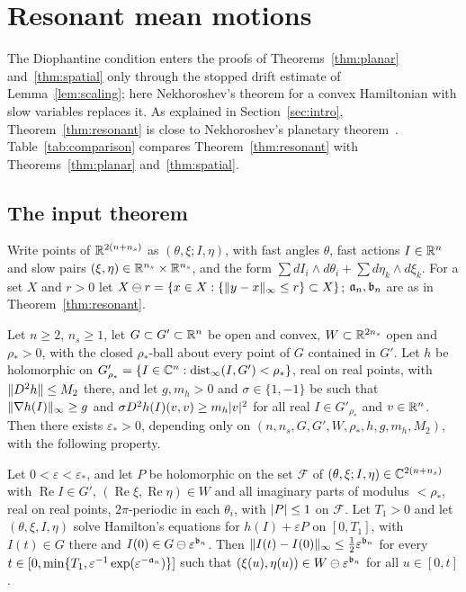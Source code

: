 \section{Resonant mean motions}\label{sec:resonant}

The Diophantine condition enters the proofs of Theorems~\ref{thm:planar} and~\ref{thm:spatial} only through the
stopped drift estimate of Lemma~\ref{lem:scaling}; here Nekhoroshev's theorem for a convex Hamiltonian with slow
variables replaces it. As explained in Section~\ref{sec:intro}, Theorem~\ref{thm:resonant} is close to Nekhoroshev's planetary theorem~\cite[Theorem~12.3]{Nek77}. Table~\ref{tab:comparison} compares
Theorem~\ref{thm:resonant} with Theorems~\ref{thm:planar} and~\ref{thm:spatial}.

\subsection{The input theorem}

Write points of $\mathbb{R}^{2(n+n_s)}$ as $(\theta,\xi;I,\eta)$, with fast angles $\theta$, fast actions $I\in\mathbb{R}^n$ and
slow pairs $(\xi,\eta)\in\mathbb{R}^{n_s}\times\mathbb{R}^{n_s}$, and the form $\sum dI_i\wedge d\theta_i+\sum d\eta_k\wedge
d\xi_k$. For a set $X$ and $r>0$ let $X\ominus r=\{x\in X:\{\lVert y-x\rVert_\infty\le r\}\subset X\}$; $\mathfrak{a}_n{},\mathfrak{b}_n{}$ are
as in Theorem~\ref{thm:resonant}.

\begin{proposition}\label{thm:partialnek}
Let $n\ge2$, $n_s\ge1$, let $G\subset G'\subset\mathbb{R}^n$ be open and convex, $W\subset\mathbb{R}^{2n_s}$ open and
$\rho_*>0$, with the closed $\rho_*$-ball about every point of $G$ contained in $G'$. Let $h$ be holomorphic on
$G'_{\rho_*}=\{I\in\mathbb{C}^n:\operatorname{dist}_\infty(I,G')<\rho_*\}$, real on real points, with
$\lVert D^2h\rVert\le M_2$ there, and let $g,m_h>0$ and $\sigma\in\{1,-1\}$ be such that $\lVert \nabla h(I)\rVert_\infty\ge g$ and
$\sigma D^2h(I)(v,v)\ge m_h\lvert v\rvert^2$ for all real $I\in G'_{\rho_*}$ and $v\in\mathbb{R}^n$. Then there exists
$\varepsilon_*>0$, depending only on $(n,n_s,G,G',W,\rho_*,h,g,m_h,M_2)$, with the following property.

Let $0<\varepsilon<\varepsilon_*$, and let $P$ be holomorphic on the set $\mathcal F$ of
$(\theta,\xi;I,\eta)\in\mathbb{C}^{2(n+n_s)}$ with $\operatorname{Re}I\in G'$, $(\operatorname{Re}\xi,\operatorname{Re}\eta)
\in W$ and all imaginary parts of modulus $<\rho_*$, real on real points, $2\pi$-periodic in each $\theta_i$, with
$\lvert P\rvert\le1$ on $\mathcal F$. Let $T_1>0$ and let $(\theta,\xi,I,\eta)$ solve Hamilton's equations for
$h(I)+\varepsilon P$ on $[0,T_1]$, with $I(t)\in G$ there and $I(0)\in G\ominus\varepsilon^{\mathfrak{b}_n{}}$. Then
$\lVert I(t)-I(0)\rVert_\infty\le\frac12\varepsilon^{\mathfrak{b}_n{}}$ for every $t\in[0,\min\{T_1,\varepsilon^{-1}\exp(\varepsilon^{-\mathfrak{a}_n{}})\}]$
such that $(\xi(u),\eta(u))\in W\ominus\varepsilon^{\mathfrak{b}_n{}}$ for all $u\in[0,t]$.
\end{proposition}

